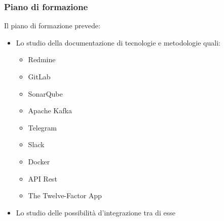 		\subsubsection{Piano di formazione}
		Il piano di formazione prevede:
		\begin{itemize}
			\item Lo studio della documentazione di tecnologie e metodologie quali:
			\begin{itemize}
				\item Redmine
				\item GitLab
				\item SonarQube
				\item Apache Kafka
				\item Telegram
				\item Slack
				\item Docker
				\item API Rest
				\item The Twelve-Factor App %
			\end{itemize}
			\item Lo studio delle possibilità d'integrazione tra di esse
		\end{itemize}

